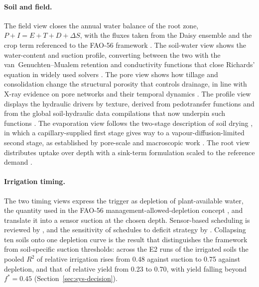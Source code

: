 \documentclass[preprint,12pt]{elsarticle}
\begin{document}
\paragraph{Soil and field.} The field view closes the annual water balance of the root zone, $P+I=E+T+D+\Delta S$, with the fluxes taken from the Daisy ensemble \cite{Hansen2012,Abrahamsen2000} and the crop term referenced to the FAO-56 framework \cite{Allen1998}. The soil-water view shows the water-content and suction profile, converting between the two with the van~Genuchten--Mualem retention and conductivity functions \cite{vanGenuchten1980,Mualem1976} that close Richards' equation \cite{Richards1931} in widely used solvers \cite{Simunek2008}. The pore view shows how tillage and consolidation change the structural porosity that controls drainage, in line with X-ray evidence on pore networks and their temporal dynamics \cite{Strudley2008,Blunt2017,Leuther2021}. The profile view displays the hydraulic drivers by texture, derived from pedotransfer functions \cite{Saxton2006,Schaap2001} and from the global soil-hydraulic data compilations that now underpin such functions \cite{Vereecken2016,Weber2024}. The evaporation view follows the two-stage description of soil drying \cite{Ritchie1972,Philip1957}, in which a capillary-supplied first stage gives way to a vapour-diffusion-limited second stage, as established by pore-scale and macroscopic work \cite{Lehmann2008,Or2013,Shokri2011}. The root view distributes uptake over depth with a sink-term formulation \cite{Feddes1978} scaled to the reference demand \cite{Allen1998}.

\paragraph{Irrigation timing.} The two timing views express the trigger as depletion of plant-available water, the quantity used in the FAO-56 management-allowed-depletion concept \cite{Allen1998}, and translate it into a sensor suction at the chosen depth. Sensor-based scheduling is reviewed by \cite{Datta2023}, and the sensitivity of schedules to deficit strategy by \cite{Fereres2007}. Collapsing ten soils onto one depletion curve is the result that distinguishes the framework from soil-specific suction thresholds: across the E2 runs of the irrigated soils the pooled $R^2$ of relative irrigation rises from 0.48 against suction to 0.75 against depletion, and that of relative yield from 0.23 to 0.70, with yield falling beyond $f^\ast=0.45$ (Section~\ref{sec:sys-decision}).
\end{document}
